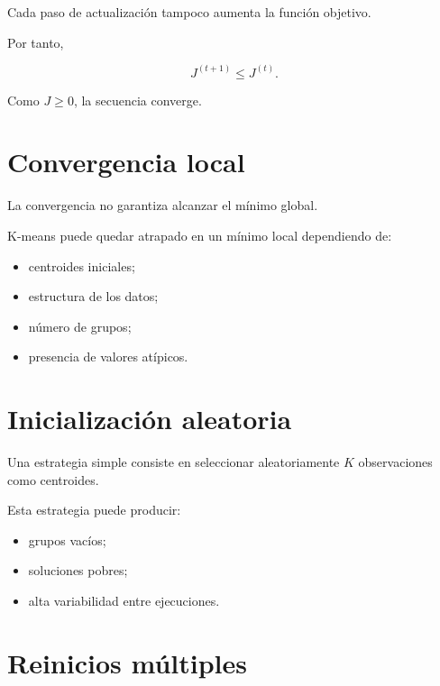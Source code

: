 \documentclass[
  spanish,
  10.5pt,
  letterpaper,
  DIV=11,
  numbers=noendperiod,
  oneside,
  open=any]{scrreprt}
\providecommand{\tightlist}{%
  \setlength{\itemsep}{0pt}\setlength{\parskip}{0pt}}
\theoremstyle{definition}
\theoremstyle{definition}
\theoremstyle{plain}
\theoremstyle{remark}
\begin{document}
Cada paso de actualización tampoco aumenta la función objetivo.

Por tanto,

\[
J^{(t+1)}
\leq
J^{(t)}.
\]

Como \(J\geq 0\), la secuencia converge.

\section*{Convergencia local}\label{convergencia-local}


La convergencia no garantiza alcanzar el mínimo global.

K-means puede quedar atrapado en un mínimo local dependiendo de:

\begin{itemize}
\tightlist
\item
  centroides iniciales;
\item
  estructura de los datos;
\item
  número de grupos;
\item
  presencia de valores atípicos.
\end{itemize}

\section*{Inicialización aleatoria}\label{inicializaciuxf3n-aleatoria}


Una estrategia simple consiste en seleccionar aleatoriamente \(K\)
observaciones como centroides.

Esta estrategia puede producir:

\begin{itemize}
\tightlist
\item
  grupos vacíos;
\item
  soluciones pobres;
\item
  alta variabilidad entre ejecuciones.
\end{itemize}

\section*{Reinicios múltiples}\label{reinicios-muxfaltiples}
\end{document}
